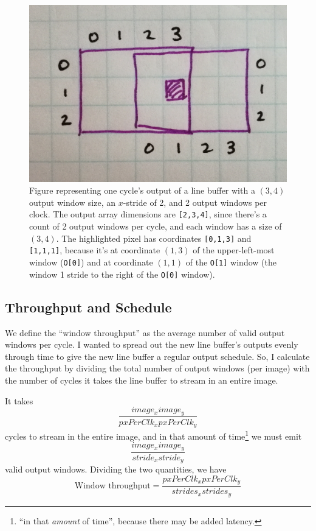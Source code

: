 \documentclass[12pt]{article}
\begin{document}
\begin{figure}[htb!]
  \centering
  \includegraphics[width=0.6\linewidth]{Figures/lb-format.jpg}
  \caption{Figure representing one cycle's output of a line buffer
    with a $(3,4)$ output window size, an $x$-stride of 2, and 2
    output windows per clock. The output array dimensions are
    \texttt{[2,3,4]}, since there's a count of 2 output windows per
    cycle, and each window has a size of $(3,4)$. The highlighted
    pixel has coordinates \texttt{[0,1,3]} and \texttt{[1,1,1]},
    because it's at coordinate $(1,3)$ of the upper-left-most window
    (\texttt{O[0]}) and at coordinate $(1,1)$ of the \texttt{O[1]}
    window (the window 1 stride to the right of the \texttt{O[0]}
    window).}
  \label{4D_output}
\end{figure}

\subsection{Throughput and Schedule}

We define the ``window throughput'' as the average number of valid
output windows per cycle. I wanted to spread out the new line buffer's
outputs evenly through time to give the new line buffer a regular
output schedule. So, I calculate the throughput by dividing the total
number of output windows (per image) with the number of cycles it
takes the line buffer to stream in an entire image.

It takes
\begin{equation}
\frac{image_x image_y}{pxPerClk_x pxPerClk_y}
\end{equation}
cycles to stream in the entire image, and in that amount of time\footnote{
``in that \textit{amount} of time'', because there may be added latency.}
we must emit
\begin{equation}
\frac{image_x image_y}{stride_x stride_y}
\end{equation}
valid output windows. Dividing the two quantities, we have
\begin{equation}
    \text{Window throughput} = \frac
      {pxPerClk_x pxPerClk_y}{strides_x strides_y}
\end{equation}
\end{document}
